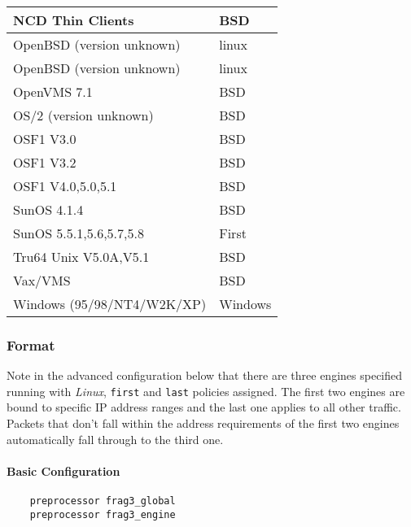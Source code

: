 \documentclass[english]{report}
\begin{document}
\begin{itemize}
\begin{itemize}
\begin{tabular}{| l | l |}
             NCD Thin Clients  & BSD \\
                        \hline
    OpenBSD (version unknown)  & linux \\
                        \hline
    OpenBSD (version unknown)  & linux \\
                        \hline
                  OpenVMS 7.1  & BSD \\
                        \hline
       OS/2 (version unknown)  & BSD \\
                        \hline
                    OSF1 V3.0  & BSD \\
                        \hline
                    OSF1 V3.2  & BSD \\
                        \hline
            OSF1 V4.0,5.0,5.1  & BSD \\
                        \hline
                  SunOS 4.1.4  & BSD \\
                        \hline
      SunOS 5.5.1,5.6,5.7,5.8  & First \\
                        \hline
        Tru64 Unix V5.0A,V5.1  & BSD \\
                        \hline
                      Vax/VMS  & BSD \\
                        \hline
   Windows (95/98/NT4/W2K/XP)  & Windows\\
\hline
\end{tabular}

\end{itemize}
\end{itemize}

\subsubsection{Format}

Note in the advanced configuration below that there are three engines specified
running with \emph{Linux}, \texttt{first} and \texttt{last} policies assigned.
The first two engines are bound to specific IP address ranges and the last one
applies to all other traffic.  Packets that don't fall within the address
requirements of the first two engines automatically fall through to the third
one.

\paragraph{Basic Configuration}
\begin{verbatim}
    preprocessor frag3_global
    preprocessor frag3_engine
\end{verbatim}
\end{document}
